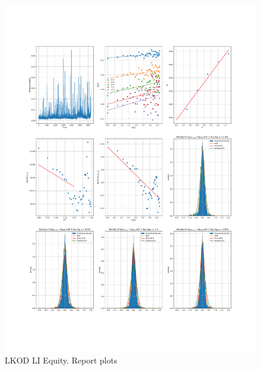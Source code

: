     \begin{figure}[h]
        \centering
        \includegraphics[width=\textwidth]{fig/LKOD LI Equity.pdf}
        \caption{LKOD LI Equity. Report plots}
    \end{figure} 

